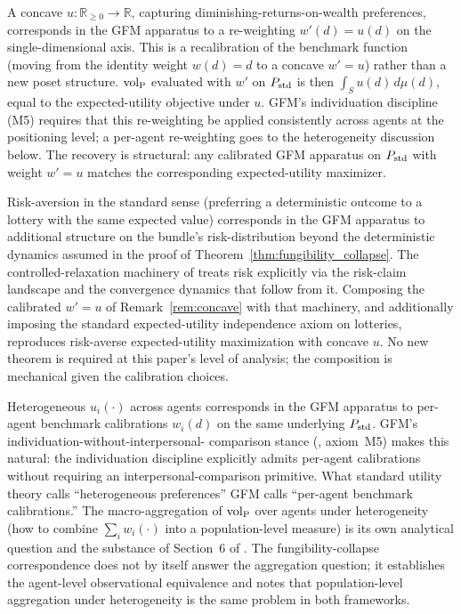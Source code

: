 \begin{remark}
\label{rem:concave}
A concave $u: \mathbb{R}_{\geq 0} \to \mathbb{R}$, capturing
diminishing-returns-on-wealth preferences, corresponds in the GFM
apparatus to a re-weighting $w'(d) = u(d)$ on the single-dimensional
axis.  This is a recalibration of the benchmark function (moving
from the identity weight $w(d) = d$ to a concave $w' = u$) rather
than a new poset structure.  ${\operatorname{vol}_{\mathrm{P}}}$ evaluated with $w'$ on $P_{\mathrm{std}}$
is then $\int_S u(d) \, d\mu(d)$, equal to the expected-utility
objective under $u$.  GFM's individuation discipline (M5) requires
that this re-weighting be applied consistently across agents at the
positioning level; a per-agent re-weighting goes to the
heterogeneity discussion below.  The recovery is structural: any
calibrated GFM apparatus on $P_{\mathrm{std}}$ with weight $w' = u$ matches
the corresponding expected-utility maximizer.
\end{remark}

\begin{remark}
\label{rem:risk_aversion}
Risk-aversion in the standard sense (preferring a deterministic
outcome to a lottery with the same expected value) corresponds in
the GFM apparatus to additional structure on the bundle's
risk-distribution beyond the deterministic dynamics assumed in the
proof of Theorem~\ref{thm:fungibility_collapse}.  The
controlled-relaxation machinery of
\citep[Controlled~Relaxation]{lasser2026wamura} treats risk
explicitly via the risk-claim landscape and the convergence dynamics
that follow from it.  Composing the calibrated $w' = u$ of
Remark~\ref{rem:concave} with that machinery, and additionally
imposing the standard expected-utility independence axiom on
lotteries, reproduces risk-averse expected-utility maximization
with concave $u$.  No new theorem is required at this paper's level
of analysis; the composition is mechanical given the calibration
choices.
\end{remark}

\begin{remark}
\label{rem:heterogeneity}
Heterogeneous $u_i(\cdot)$ across agents corresponds in the GFM
apparatus to per-agent benchmark calibrations $w_i(d)$ on the same
underlying $P_{\mathrm{std}}$.  GFM's individuation-without-interpersonal-
comparison stance (\citep[Proposition~1]{lasser2026poset},
axiom~M5) makes this natural: the individuation discipline
explicitly admits per-agent calibrations without requiring an
interpersonal-comparison primitive.  What standard utility theory
calls ``heterogeneous preferences'' GFM calls ``per-agent benchmark
calibrations.''  The macro-aggregation of ${\operatorname{vol}_{\mathrm{P}}}$ over agents under
heterogeneity (how to combine $\sum_i w_i(\cdot)$ into a
population-level measure) is its own analytical question and the
substance of Section~6 of \citep{stiglitz2009report}.  The
fungibility-collapse correspondence does not by itself answer the
aggregation question; it establishes the agent-level
observational equivalence and notes that population-level
aggregation under heterogeneity is the same problem in both
frameworks.
\end{remark}

